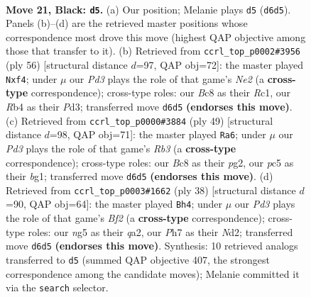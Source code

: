 \documentclass[11pt]{article}
\begin{document}
\clearpage

\begin{figure}[p]\centering
\begin{subfigure}{0.46\textwidth}\centering
\resizebox{\linewidth}{!}{%
\newchessgame
\chessboard[
  setfen={2bqrk2/Q1p2p1p/P1pp1n2/2P3N1/1r2P3/8/2P2PP1/R1B2RK1 b - - 0 21},
  showmover=false,
  pgfstyle=straightmove, color=movearrow, markmove={d6-d5}
]}
\caption{}
\end{subfigure}\hfill
\begin{subfigure}{0.46\textwidth}\centering
\resizebox{\linewidth}{!}{%
\newchessgame
\chessboard[
  setfen={6bk/3qr1bp/r5p1/1p6/1P1pBp2/3P2PP/1RQ1N2K/2R5 w - - 0 29},
  showmover=false,
  pgfstyle=straightmove, color=movearrow, markmove={e2-f4}
]}
\caption{}
\end{subfigure}
\\[4pt]
\begin{subfigure}{0.46\textwidth}\centering
\resizebox{\linewidth}{!}{%
\newchessgame
\chessboard[
  setfen={5rk1/p5p1/1r1q2n1/2pp4/QP5p/2P2NbP/P5P1/K2R2BR b - - 0 25},
  showmover=false,
  pgfstyle=straightmove, color=movearrow, markmove={b6-a6}
]}
\caption{}
\end{subfigure}\hfill
\begin{subfigure}{0.46\textwidth}\centering
\resizebox{\linewidth}{!}{%
\newchessgame
\chessboard[
  setfen={4rrk1/pR2bppp/3pP3/2p5/2P1P1n1/8/q2NQBPP/5RK1 w - - 1 20},
  showmover=false,
  pgfstyle=straightmove, color=movearrow, markmove={f2-h4}
]}
\caption{}
\end{subfigure}
\caption{\textbf{Move 21, Black: \texttt{d5}.} (a) Our position; Melanie plays \texttt{d5} (\texttt{d6d5}). Panels (b)--(d) are the retrieved master positions whose correspondence most drove this move (highest QAP objective among those that transfer to it). (b) Retrieved from \texttt{ccrl\_top\_p0002\#3956} (ply 56) [structural distance $d$=97, QAP obj=72]: the master played \texttt{Nxf4}; under $\mu$ our \emph{Pd3} plays the role of that game's \emph{Ne2} (a \textbf{cross-type} correspondence); cross-type roles: our \emph{B}c8 as their \emph{R}c1, our \emph{R}b4 as their \emph{P}d3; transferred move \texttt{d6d5} \textbf{(endorses this move)}. (c) Retrieved from \texttt{ccrl\_top\_p0000\#3884} (ply 49) [structural distance $d$=98, QAP obj=71]: the master played \texttt{Ra6}; under $\mu$ our \emph{Pd3} plays the role of that game's \emph{Rb3} (a \textbf{cross-type} correspondence); cross-type roles: our \emph{B}c8 as their \emph{p}g2, our \emph{p}c5 as their \emph{b}g1; transferred move \texttt{d6d5} \textbf{(endorses this move)}. (d) Retrieved from \texttt{ccrl\_top\_p0003\#1662} (ply 38) [structural distance $d$=90, QAP obj=64]: the master played \texttt{Bh4}; under $\mu$ our \emph{Pd3} plays the role of that game's \emph{Bf2} (a \textbf{cross-type} correspondence); cross-type roles: our \emph{n}g5 as their \emph{q}a2, our \emph{P}h7 as their \emph{N}d2; transferred move \texttt{d6d5} \textbf{(endorses this move)}. Synthesis: 10 retrieved analogs transferred to \texttt{d5} (summed QAP objective 407, the strongest correspondence among the candidate moves); Melanie committed it via the \texttt{search} selector.}
\label{fig:thought-m41}
\end{figure}
\end{document}
